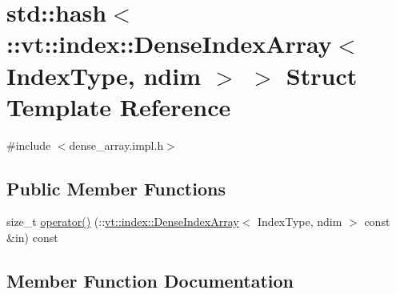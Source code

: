 \hypertarget{structstd_1_1hash_3_1_1vt_1_1index_1_1_dense_index_array_3_01_index_type_00_01ndim_01_4_01_4}{}\section{std\+:\+:hash$<$\+:\+:vt\+:\+:index\+:\+:Dense\+Index\+Array$<$ Index\+Type, ndim $>$ $>$ Struct Template Reference}
\label{structstd_1_1hash_3_1_1vt_1_1index_1_1_dense_index_array_3_01_index_type_00_01ndim_01_4_01_4}


{\ttfamily \#include $<$dense\+\_\+array.\+impl.\+h$>$}

\subsection*{Public Member Functions}
\begin{DoxyCompactItemize}
\item 
size\+\_\+t \hyperlink{structstd_1_1hash_3_1_1vt_1_1index_1_1_dense_index_array_3_01_index_type_00_01ndim_01_4_01_4_ab5dbe391d355258ab261a4dd0203e4ba}{operator()} (\+::\hyperlink{structvt_1_1index_1_1_dense_index_array}{vt\+::index\+::\+Dense\+Index\+Array}$<$ Index\+Type, ndim $>$ const \&in) const
\end{DoxyCompactItemize}


\subsection{Member Function Documentation}
\mbox{\label{structstd_1_1hash_3_1_1vt_1_1index_1_1_dense_index_array_3_01_index_type_00_01ndim_01_4_01_4_ab5dbe391d355258ab261a4dd0203e4ba}} 
